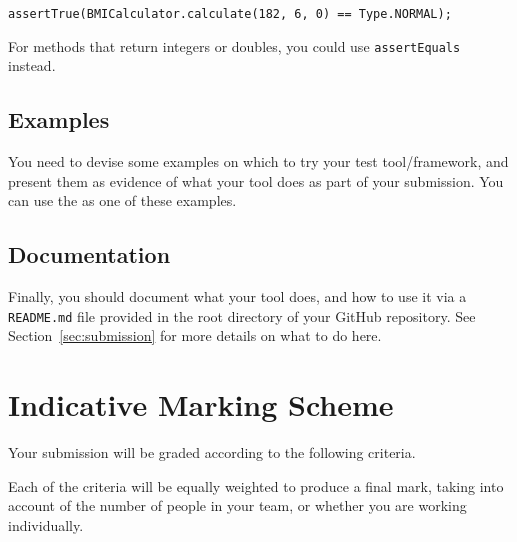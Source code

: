 \begin{center}
{\tt \scriptsize assertTrue(BMICalculator.calculate(182, 6, 0) == Type.NORMAL);}
\end{center}

For methods that return integers or doubles, you could use {\tt assertEquals} instead.

\subsection{Examples}

You need to devise some examples on which to try your test tool/framework, and
present them as evidence of what your tool does as part of your submission. You
can use the \bmicalculatorclass as one of these examples. 


\subsection{Documentation}

Finally, you should document what your tool does, and how to use it via a {\tt
README.md} file provided in the root directory of your GitHub repository. See
Section~\ref{sec:submission} for more details on what to do here.


\section{Indicative Marking Scheme}

Your submission will be graded according to the following criteria. 

Each of the criteria will be equally weighted to produce a final mark,  taking
into account of the number of people in your team, or whether you are working
individually. 

